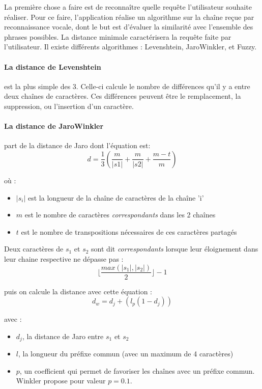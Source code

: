 La première chose a faire est de reconnaître quelle requête l'utilisateur souhaite réaliser. Pour ce faire, 
l'application réalise un algorithme sur la chaîne reçue par reconnaissance vocale, dont le but est d'évaluer 
la similarité avec l'ensemble des phrases possibles. La distance minimale caractérisera la requête faite par 
l'utilisateur. Il existe différents algorithmes : Levenshtein, JaroWinkler, et Fuzzy. 

\paragraph{La distance de Levenshtein}est la plus simple des 3. Celle-ci calcule le nombre de différences 
qu'il y a entre deux chaînes de caractères. Ces différences peuvent être le remplacement, la suppression, ou 
l'insertion d'un caractère.

\paragraph{La distance de JaroWinkler} part de la distance de Jaro dont l'équation est:
\begin{equation}
 d = \frac{1}{3}(\frac{m}{|s1|}+\frac{m}{|s2|}+\frac{m-t}{m})
\end{equation}

où :
\begin{itemize}
 \item $|s_i|$ est la longueur de la chaîne de caractères de la chaîne 'i'
 \item $m$ est le nombre de caractères \emph{correspondants} dans les 2 chaînes
 \item $t$ est le nombre de transpositions nécessaires de ces caractères partagés
\end{itemize}

Deux caractères de $s_1$ et $s_2$ sont dit \emph{correspondants} lorsque leur éloignement dans leur chaine 
respective ne dépasse pas :
\begin{equation}
 \lfloor{\frac{max(|s_1|, |s_2|)}{2}}\rfloor - 1
\end{equation}


puis on calcule la distance avec cette équation :
\begin{equation}
 d_w = d_j + (l_p(1-d_j))
\end{equation}

avec :
\begin{itemize}
 \item $d_j$, la distance de Jaro entre $s_1$ et $s_2$
 \item $l$, la longueur du préfixe commun (avec un maximum de 4 caractères)
 \item $p$, un coefficient qui permet de favoriser les chaînes avec un préfixe commun. Winkler propose 
pour valeur $p=0.1$.

\end{itemize}


